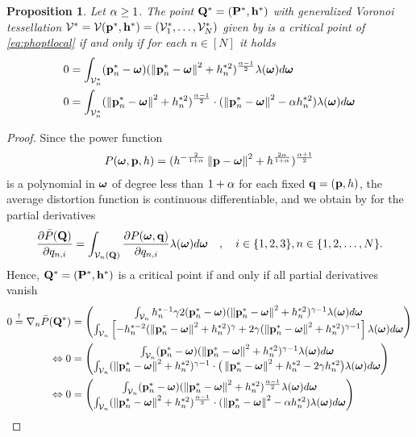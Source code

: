 \documentclass[smallabstract,smallcaptions]{dccpaper}
\newtheorem{prop}{Proposition}
\newcommand{\df}{\ensuremath{\lam}}         %
\newcommand{\Pbar}{\ensuremath{\bar{P}}}         %
\newcommand{\Vor}{\ensuremath{\mathcal{V}}}         %
\begin{document}
\begin{prop}\label{prop:necessarycond}
  Let $\alpha \geq 1$. The point $\mathbf Q^*=(\mathbf P ^*,{\mathbf h}^*)$ with generalized Voronoi tessellation
  $\Vor^*=\Vor(\vp^*,\vh^*)=(\Vor_1^*,\dots,\Vor^*_N)$ given by  is a critical point of
  \eqref{eq:phoptlocal} if  and only if for each $n\in[N]$ it holds
  \begin{align}
    0&= \int_{\Vor^*_n} (\vp^*_{n}-\vome) (\Norm{\vp^*_n-\vome}^2 +h_n^{*2})^{\frac{\alp-1}{2}} \df(\vome)d
    \vome\label{eq:pnopt}\\
    0&= \int_{\Vor^*_n} (\Norm{\vp^*_n-\vome}^2 +h_n^{*2})^{\frac{\alp-1}{2}}\cdot (\Norm{\vp_n^*-\vome}^2 - \alp
    h_n^{*2} ) \df(\vome)d\vome
  \label{eq:criticalpoint}
  \end{align}
\end{prop}
%
\begin{proof}
Since the power function 
%
\begin{align}
  P(\boldsymbol{ \omega},{\mathbf p},h)= (h^{-\frac{2}{1+\alpha}} \left\|{\mathbf p}-\boldsymbol{ \omega}\right\| ^2 + h^{\frac{2\alpha}{1+\alpha}})^{\frac{\alpha+1}{2}}
\end{align}  
%
is a polynomial in $\boldsymbol{ \omega}$ of degree less than $1+\alpha$ for each fixed ${\mathbf q}=({\mathbf p},h)$, the average distortion function is continuous
differentiable, and we obtain by \cite[Thm.1]{WJ18} for the partial derivatives 
%
\begin{align}
  \frac{\partial \Pbar(\vQ)}{\partial q_{n,i}} = \int_{\Vor_n(\vQ)} \frac{\partial P(\vome,\vq)}{\partial q_{n,i}}
  \df(\vome)d\vome\quad,\quad i\in\{1,2,3\},n\in\{1,2,\dots,N\}.
\end{align}
%
Hence, $\mathbf Q^*=(\mathbf P ^*,{\mathbf h}^*)$ is a critical point if and only if all partial derivatives vanish 
%
\begin{align}
 0\overset{!}{=} \nabla_n \Pbar(\vQ^*) &= \begin{pmatrix} 
   \int_{\Vor_n} h_n^{*-1} \gam 2 (\vp^*_{n}-\vome)  (\Norm{\vp_n^*-\vome}^2 +h_n^{*2})^{\gam-1}  \df(\vome)d \vome\\
   \int_{\Vor_n} \left[-h_n^{*-2}(\Norm{\vp^*_n-\vome}^2 + h_n^{*2})^{\gam} + 2\gam (\Norm{\vp_n^*-\vome}^2 +h_n^{*2})^{\gam-1}\right]
    \df(\vome)d \vome
  \end{pmatrix} \notag\\
\LRA 0&= \begin{pmatrix}
  \int_{\Vor_n} (\vp^*_{n}-\vome) (\Norm{\vp^*_n-\vome}^2 +h_n^{*2})^{\gam-1} \df(\vome)d \vome\\
  \int_{\Vor_n} (\Norm{\vp^*_n-\vome}^2 +h_n^{*2})^{\gam-1}\cdot \big(\Norm{\vp^*_n-\vome}^2+h_n^{*2} - 2\gam h_n^{*2} \big)
  \df(\vome)d \vome
 \end{pmatrix}\notag\\
 \LRA 0&= \begin{pmatrix}
   \int_{\Vor_n} (\vp_{n}^*-\vome) (\Norm{\vp^*_n-\vome}^2 +h_n^{*2})^{\frac{\alp-1}{2}} \df(\vome)d \vome\\
   \int_{\Vor_n} (\Norm{\vp_n^*-\vome}^2 +h_n^{*2})^{\frac{\alp-1}{2}}\cdot (\Norm{\vp_n^*-\vome}^2 - \alp h_n^{*2} )
   \df(\vome)d \vome
  \end{pmatrix}\label{eq:graddph}
\end{align}
%
\end{proof}
\end{document}
